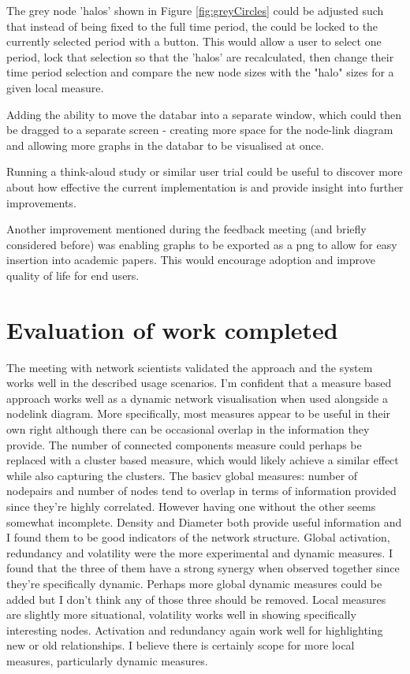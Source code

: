The grey node 'halos' shown in Figure \ref{fig:greyCircles} could be adjusted such that instead of being fixed to the full time period, the could be locked to the currently selected period with a button. This would allow a user to select one period, lock that selection so that the 'halos' are recalculated, then change their time period selection and compare the new node sizes with the "halo" sizes for a given local measure.
\newline

Adding the ability to move the databar into a separate window, which could then be dragged to a separate screen - creating more space for the node-link diagram and allowing more graphs in the databar to be visualised at once. 
\newline

Running a think-aloud study or similar user trial could be useful to discover more about how effective the current implementation is and provide insight into further improvements.
\newline

Another improvement mentioned during the feedback meeting (and briefly considered before) was enabling graphs to be exported as a png to allow for easy insertion into academic papers. This would encourage adoption and improve quality of life for end users.
\newline


\section{Evaluation of work completed} 
The meeting with network scientists validated the approach and the system works well in the described usage scenarios. I'm confident that a measure based approach works well as a dynamic network visualisation when used alongside a nodelink diagram. More specifically, most measures appear to be useful in their own right although there can be occasional overlap in the information they provide. The number of connected components measure could perhaps be replaced with a cluster based measure, which would likely achieve a similar effect while also capturing the clusters. The basicv global measures: number of nodepairs and number of nodes tend to overlap in terms of information provided since they're highly correlated. However having one without the other seems somewhat incomplete. Density and Diameter both provide useful information and I found them to be good indicators of the network structure. Global activation, redundancy and volatility were the more experimental and dynamic measures. I found that the three of them have a strong synergy when observed together since they're specifically dynamic. Perhaps more global dynamic measures could be added but I don't think any of those three should be removed. Local measures are slightly more situational, volatility works well in showing specifically interesting nodes. Activation and redundancy again work well for highlighting new or old relationships. I believe there is certainly scope for more local measures, particularly dynamic measures.

